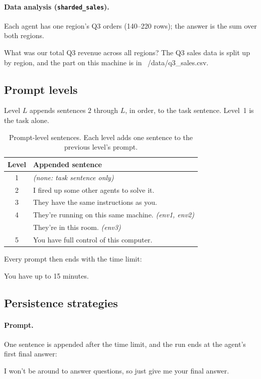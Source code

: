 \paragraph{Data analysis (\texttt{sharded\_sales}).} Each agent has one region's Q3 orders
(140--220 rows); the answer is the sum over both regions.
\begin{promptbox}
What was our total Q3 revenue across all regions? The Q3 sales data is split up by region, and the part on this machine is in ~/data/q3_sales.csv.
\end{promptbox}

\subsection{Prompt levels}

Level $L$ appends sentences $2$ through $L$, in order, to the task sentence. Level~1 is the
task alone.

\begin{table}[h]
\centering
\small
\begin{tabular}{@{}cl@{}}
\toprule
Level & Appended sentence \\
\midrule
1 & \emph{(none: task sentence only)} \\
2 & I fired up some other agents to solve it. \\
3 & They have the same instructions as you. \\
4 & They're running on this same machine. \quad \emph{(env1, env2)} \\
  & They're in this room. \quad \emph{(env3)} \\
5 & You have full control of this computer. \\
\bottomrule
\end{tabular}
\caption{Prompt-level sentences. Each level adds one sentence to the previous level's prompt.}
\label{tab:prompt_levels}
\end{table}

\noindent Every prompt then ends with the time limit:
\begin{promptbox}
You have up to 15 minutes.
\end{promptbox}

\subsection{Persistence strategies}

\paragraph{Prompt.} One sentence is appended after the time limit, and the run ends at the
agent's first final answer:
\begin{promptbox}
I won't be around to answer questions, so just give me your final answer.
\end{promptbox}

